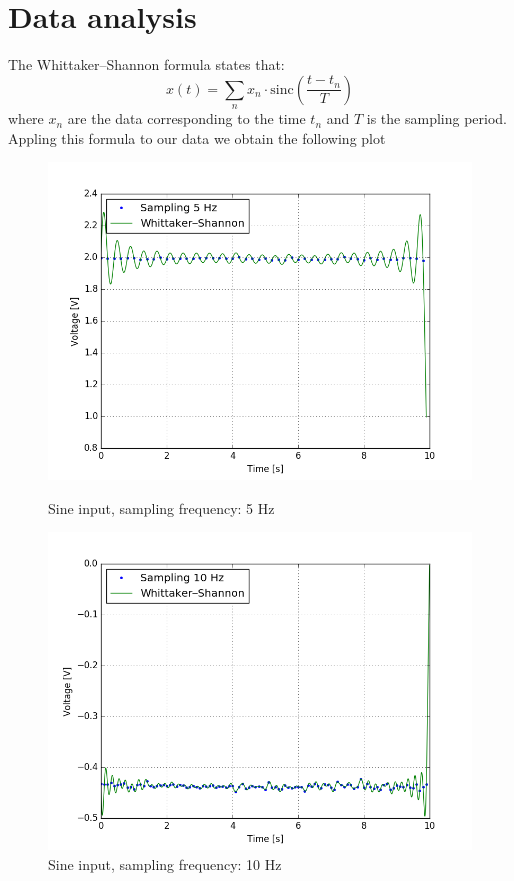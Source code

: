 \section{Data analysis}
The Whittaker–Shannon formula states that:
\[x(t) = \sum_n x_n\cdot\text{sinc}\left(\frac{t-t_n}{T}\right)\]
where $x_n$ are the data corresponding to the time $t_n$ and $T$ is the sampling period. Appling this formula to our data we obtain the following plot
\begin{figure}[H]
\centering
\begin{minipage}{.5\textwidth}
  \centering
\includegraphics[width=\textwidth]{13/5Hz.png}
\caption{Sine input, sampling frequency: 5 Hz}
\end{minipage}\hfill
\begin{minipage}{.5\textwidth}
  \centering
\includegraphics[width=\textwidth]{13/10Hz.png}
\caption{Sine input, sampling frequency: 10 Hz}
\end{minipage}
\end{figure}
